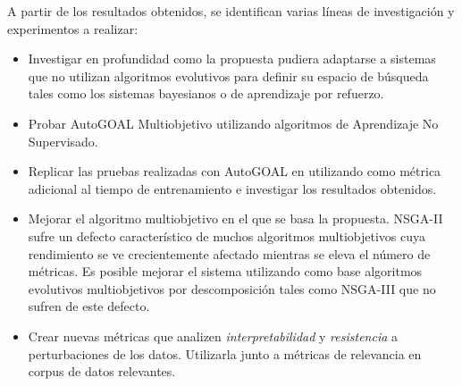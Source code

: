 \begin{recomendations}
A partir de los resultados obtenidos, se identifican varias l\'ineas de investigaci\'on y experimentos a realizar:
\begin{itemize}
    \item Investigar en profundidad  como la propuesta pudiera adaptarse a sistemas que no utilizan algoritmos evolutivos para definir su espacio de b\'usqueda tales como los sistemas bayesianos o de aprendizaje por refuerzo.
    \item Probar AutoGOAL Multiobjetivo utilizando algoritmos de Aprendizaje No Supervisado.
    \item Replicar las pruebas realizadas con AutoGOAL en  utilizando como m\'etrica adicional al tiempo de entrenamiento  e investigar los resultados obtenidos. 
    \item Mejorar el algoritmo multiobjetivo en el que se basa la propuesta. NSGA-II sufre un defecto caracter\'istico de muchos algoritmos multiobjetivos cuya rendimiento se ve crecientemente afectado mientras se eleva el n\'umero de m\'etricas. Es posible mejorar el sistema utilizando como base algoritmos evolutivos multiobjetivos por descomposici\'on tales como NSGA-III  que no sufren de este defecto.
    
    \item Crear nuevas m\'etricas que analizen \textit{interpretabilidad} y \textit{resistencia} a perturbaciones de los datos. Utilizarla junto a m\'etricas de relevancia en corpus de datos relevantes.
\end{itemize}

\end{recomendations}
